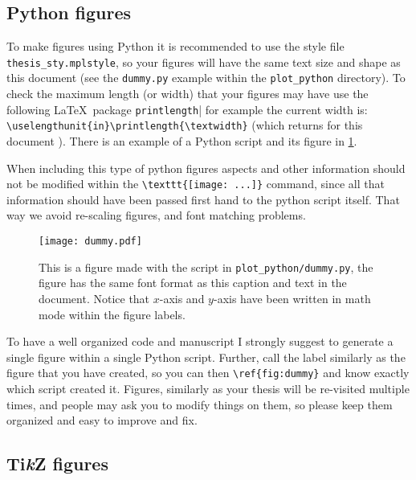\subsection{Python figures}

To make figures using Python it is recommended to use the style file \texttt{thesis\_sty.mplstyle}, so your figures will have the same text size and shape as this document (see the \texttt{dummy.py} example within the \texttt{plot\_python} directory).
To check the maximum length (or width) that your figures may have use the following \LaTeX~package \texttt{printlength}| for example the current width is: \verb|\uselengthunit{in}\printlength{\textwidth}| (which returns for this document \printlength{\textwidth}). There is an example of a Python script and its figure in \cref{fig:dummy}.

When including this type of python figures aspects and other information should not be modified within the \verb|\texttt{[image: ...]}| command, since all that information should have been passed first hand to the python script itself. That way we avoid re-scaling figures, and font matching problems.

\begin{figure}[t]
  \centering
  \texttt{[image: dummy.pdf]}
  \caption[My first Python figure]{This is a figure made with the script in \texttt{plot\_python/dummy.py}, the figure has the same font format as this caption and text in the document. Notice that $x$-axis and $y$-axis have been written in math mode within the figure labels.}
  \label{fig:dummy}
\end{figure}

To have a well organized code and manuscript I strongly suggest to generate a single figure within a single Python script. Further, call the label similarly as the figure that you have created, so you can then \verb|\ref{fig:dummy}| and know exactly which script created it. Figures, similarly as your thesis will be re-visited multiple times, and people may ask you to modify things on them, so please keep them organized and easy to improve and fix.

\subsection{Ti\textit{k}Z figures}

